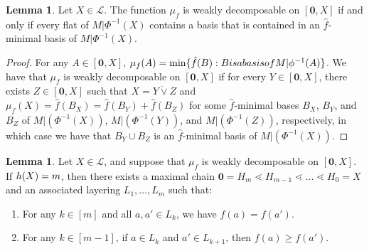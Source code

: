 \documentclass[a4paper,11pt,reqno]{article}
\theoremstyle{definition}
\newtheorem{lemma}[theorem]{{{Lemma}}}
\newcommand{\zero}{{\mathbf{0}}}
\begin{document}
\begin{lemma}\label{lem:weak_val_mat_bases}
    Let $X\in\mathcal{L}$. The function $\mu_f$ is weakly decomposable on $[\zero,X]$ if and only if every flat of $M|\Phi^{-1}(X)$ contains a basis that is contained in an $\hat{f}$-minimal basis of $M|\Phi^{-1}(X)$.
\end{lemma}
\begin{proof}
    For any $A \in [\zero,X]$, $\mu_f(A)=\min\{\hat{f}(B):B\textup{ is a basis of }
    M|\phi^{-1}(A)\}$.
    We have that $\mu_f$ is weakly decomposable on $[\zero,X]$ if for every $Y \in[\zero,X]$, there exists $Z \in [\zero, X]$ such that $X=Y\dot\vee Z$ and
    $\mu_f(X)=\hat{f}(B_X) = \hat{f}(B_Y)+\hat{f}(B_Z)$ for some 
    $\hat{f}$-minimal bases $B_X$, $B_Y$, and $B_Z$ of $M|(\Phi^{-1}(X))$, $M|(\Phi^{-1}(Y))$, and $M|(\Phi^{-1}(Z))$, respectively, 
in which case we have that $B_Y\cup B_Z$ is an $\hat{f}$-minimal basis of $M|(\Phi^{-1}(X))$. 
\end{proof}

\begin{lemma}\label{lem:q-mod_implies_mu-support}
    Let \(X\in\mathcal{L}\), and suppose that \(\mu_f\) is weakly decomposable on \([\zero,X]\). If \(\textup{h}(X) = m\), then there exists a maximal chain $\zero = H_m \lessdot H_{m-1} \lessdot \dots \lessdot H_0 = X$
    and an associated layering \(L_1, \dots, L_m\) such that:  
    \begin{enumerate}
        \item For any \(k\in[m]\) and all \(a, a' \in L_k\), we have \(f(a) = f(a')\).  
        \item For any \(k \in [m-1]\), if \(a \in L_k\) and \(a' \in L_{k+1}\), then \(f(a) \geq f(a')\).  
    \end{enumerate}
\end{lemma}
\end{document}
